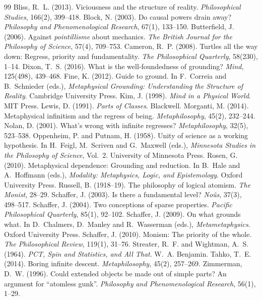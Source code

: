 \documentclass{situationist-preprint}
\begin{document}
\begin{thebibliography}{99}\small
{} Bliss, R.~L. (2013). Viciousness and the structure of reality. \emph{Philosophical Studies}, 166(2), 399--418.
 Block, N. (2003). Do causal powers drain away? \emph{Philosophy and Phenomenological Research}, 67(1), 133--150.
 Butterfield, J. (2006). Against \emph{pointillisme} about mechanics. \emph{The British Journal for the Philosophy of Science}, 57(4), 709--753.
 Cameron, R.~P. (2008). Turtles all the way down: Regress, priority and fundamentality. \emph{The Philosophical Quarterly}, 58(230), 1--14.
 Dixon, T.~S. (2016). What is the well-foundedness of grounding? \emph{Mind}, 125(498), 439--468.
 Fine, K. (2012). Guide to ground. In F.~Correia and B.~Schnieder (eds.), \emph{Metaphysical Grounding: Understanding the Structure of Reality}. Cambridge University Press.
 Kim, J. (1998). \emph{Mind in a Physical World}. MIT Press.
 Lewis, D. (1991). \emph{Parts of Classes}. Blackwell.
 Morganti, M. (2014). Metaphysical infinitism and the regress of being. \emph{Metaphilosophy}, 45(2), 232--244.
 Nolan, D. (2001). What's wrong with infinite regresses? \emph{Metaphilosophy}, 32(5), 523--538.
 Oppenheim, P. and Putnam, H. (1958). Unity of science as a working hypothesis. In H.~Feigl, M.~Scriven and G.~Maxwell (eds.), \emph{Minnesota Studies in the Philosophy of Science}, Vol.~2. University of Minnesota Press.
 Rosen, G. (2010). Metaphysical dependence: Grounding and reduction. In B.~Hale and A.~Hoffmann (eds.), \emph{Modality: Metaphysics, Logic, and Epistemology}. Oxford University Press.
 Russell, B. (1918--19). The philosophy of logical atomism. \emph{The Monist}, 28--29.
 Schaffer, J. (2003). Is there a fundamental level? \emph{No\^us}, 37(3), 498--517.
 Schaffer, J. (2004). Two conceptions of sparse properties. \emph{Pacific Philosophical Quarterly}, 85(1), 92--102.
 Schaffer, J. (2009). On what grounds what. In D.~Chalmers, D.~Manley and R.~Wasserman (eds.), \emph{Metametaphysics}. Oxford University Press.
 Schaffer, J. (2010). Monism: The priority of the whole. \emph{The Philosophical Review}, 119(1), 31--76.
 Streater, R.~F. and Wightman, A.~S. (1964). \emph{PCT, Spin and Statistics, and All That}. W.~A. Benjamin.
 Tahko, T.~E. (2014). Boring infinite descent. \emph{Metaphilosophy}, 45(2), 257--269.
 Zimmerman, D.~W. (1996). Could extended objects be made out of simple parts? An argument for \enquote{atomless gunk}. \emph{Philosophy and Phenomenological Research}, 56(1), 1--29.
\end{thebibliography}
\end{document}
